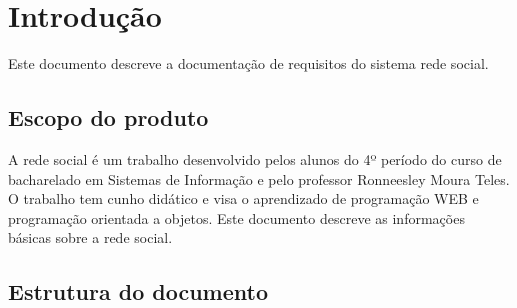 \chapter{Introdução}
	
Este documento descreve a documentação de requisitos do sistema rede social.

\section{Escopo do produto}

A rede social é um trabalho desenvolvido pelos alunos do 4º período do curso de bacharelado
em Sistemas de Informação e pelo professor Ronneesley Moura Teles.
O trabalho tem cunho didático e visa o aprendizado de programação WEB e programação orientada a objetos.
Este documento descreve as informações básicas sobre a rede social.
  

\section{Estrutura do documento}